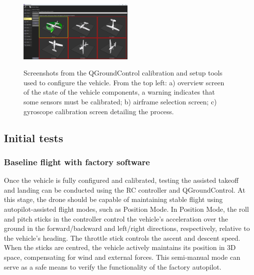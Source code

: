 \begin{figure}[H]
  \centering
  \\
  \includegraphics[width=0.5\textwidth, keepaspectratio]{img/qgc-config-2.png}
  \caption{Screenshots from the QGroundControl calibration and setup tools used to configure the vehicle. From the top left: a) overview screen of the state of the vehicle components, a warning indicates that some sensors must be calibrated; b) airframe selection screen; c) gyroscope calibration screen detailing the process.}
  \label{fig:qgc-config}
\end{figure}


\subsection{Initial tests}
\label{sec:test-8-flight}


\subsubsection{Baseline flight with factory software}
\label{subsec:fl-test-1}

Once the vehicle is fully configured and calibrated, testing the assisted takeoff and landing can be conducted using the RC controller and QGroundControl. At this stage, the drone should be capable of maintaining stable flight using autopilot-assisted flight modes, such as Position Mode. In Position Mode, the roll and pitch sticks in the controller control the vehicle's acceleration over the ground in the forward/backward and left/right directions, respectively, relative to the vehicle's heading. The throttle stick controls the ascent and descent speed. When the sticks are centred, the vehicle actively maintains its position in 3D space, compensating for wind and external forces. This semi-manual mode can serve as a safe means to verify the functionality of the factory autopilot.


